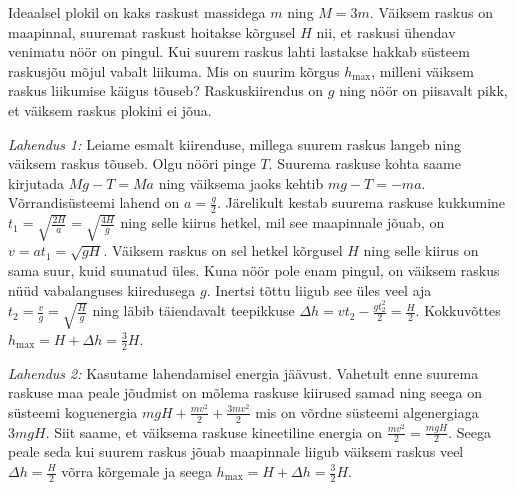 
Ideaalsel plokil on kaks raskust massidega $m$ ning $M=3m$. Väiksem raskus on maapinnal, suuremat raskust hoitakse kõrgusel $H$ nii, et raskusi ühendav venimatu nöör on pingul. Kui suurem raskus lahti lastakse hakkab süsteem raskusjõu mõjul vabalt liikuma. Mis on suurim kõrgus $h_\text{max}$, milleni väiksem raskus liikumise käigus tõuseb? Raskuskiirendus on $g$ ning nöör on piisavalt pikk, et väiksem raskus plokini ei jõua.


\hint

\solu
\emph{Lahendus 1:} Leiame esmalt kiirenduse, millega suurem raskus langeb ning väiksem raskus tõuseb. Olgu nööri pinge $T$. Suurema raskuse kohta saame kirjutada $Mg-T=Ma$ ning väiksema jaoks kehtib $mg-T=-ma$. Võrrandisüsteemi lahend on $a=\frac{g}{2}$. Järelikult kestab suurema raskuse kukkumine $t_1=\sqrt{\frac{2H}{a}}=\sqrt{\frac{4H}{g}}$ ning selle kiirus hetkel, mil see maapinnale jõuab, on $v=at_1=\sqrt{gH}$. Väiksem raskus on sel hetkel kõrgusel $H$ ning selle kiirus on sama suur, kuid suunatud üles. Kuna nöör pole enam pingul, on väiksem raskus nüüd vabalanguses kiiredusega $g$. Inertsi tõttu liigub see üles veel aja $t_2=\frac{v}{g}=\sqrt{\frac{H}{g}}$ ning läbib täiendavalt teepikkuse $\Delta h=vt_2-\frac{gt^2_2}{2}=\frac{H}{2}$. Kokkuvõttes $h_\text{max}=H+\Delta h=\frac{3}{2}H$.

\emph{Lahendus 2:} Kasutame lahendamisel energia jäävust. Vahetult enne suurema raskuse maa peale jõudmist on mõlema raskuse kiirused samad ning seega on süsteemi koguenergia $mgH+\frac{mv^2}{2}+\frac{3mv^2}{2}$ mis on võrdne süsteemi algenergiaga $3mgH$. Siit saame, et väiksema raskuse kineetiline energia on $\frac{mv^2}{2}=\frac{mgH}{2}$. Seega peale seda kui suurem raskus jõuab maapinnale liigub väiksem raskus veel $\Delta h = \frac{H}{2}$ võrra kõrgemale ja seega $h_\text{max}=H+\Delta h=\frac{3}{2}H$.
\probend